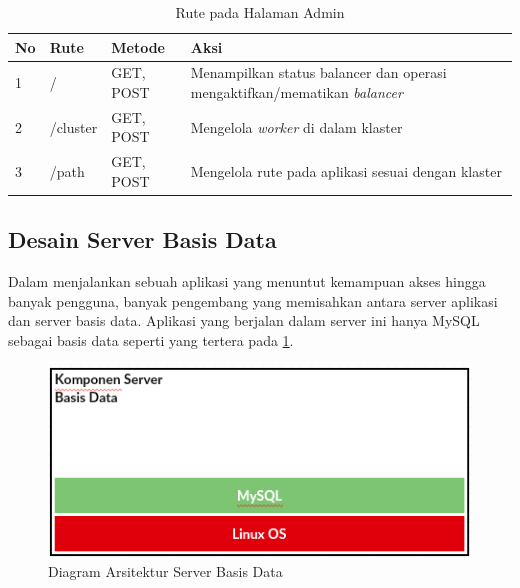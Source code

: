 \documentclass{ta-its}
\begin{document}
				\begin{longtable}{|p{}|p{}|p{}|p{}|} %
					
					\caption{Rute pada Halaman Admin} \label{tabelRuteHalamanAdmin} \\
					\hline
					\textbf{No} & \textbf{Rute} & \textbf{Metode} & \textbf{Aksi} \\ \hline
					
					\endhead
					\endfoot
					\endlastfoot
					
					1 & / & GET, POST & Menampilkan status balancer dan operasi mengaktifkan/mematikan \textit{balancer}\\ \hline
					2 & /cluster & GET, POST & Mengelola \textit{worker} di dalam klaster \\ \hline
					3 & /path & GET, POST & Mengelola rute pada aplikasi sesuai dengan klaster \\ \hline

				\end{longtable}
				
			\subsection{Desain Server Basis Data}
				Dalam menjalankan sebuah aplikasi yang menuntut kemampuan akses hingga banyak pengguna, banyak pengembang yang memisahkan antara server aplikasi dan server basis data. Aplikasi yang berjalan dalam server ini hanya MySQL sebagai basis data seperti yang tertera pada \ref{gambarArsitekturDB}.
			    
				\begin{figure}[h] %
					\centering
					\includegraphics[width=\linewidth]{contoh_img/kompdb}
					\caption{Diagram Arsitektur Server Basis Data}
					\label{gambarArsitekturDB}
				\end{figure}
\end{document}
